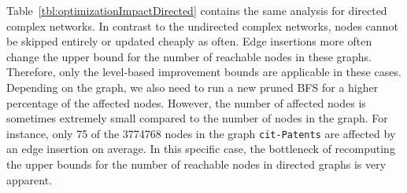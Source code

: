 Table~\ref{tbl:optimizationImpactDirected} contains the same analysis for directed complex networks. In contrast to the undirected complex networks, nodes cannot be skipped entirely or updated cheaply as often. Edge insertions more often change the upper bound for the number of reachable nodes in these graphs. Therefore, only the level-based improvement bounds are applicable in these cases. Depending on the graph, we also need to run a new pruned BFS for a higher percentage of the affected nodes. However, the number of affected nodes is sometimes extremely small compared to the number of nodes in the graph. For instance, only 75 of the 3774768 nodes in the graph \texttt{cit-Patents} are affected by an edge insertion on average. In this specific case, the bottleneck of recomputing the upper bounds for the number of reachable nodes in directed graphs is very apparent.

